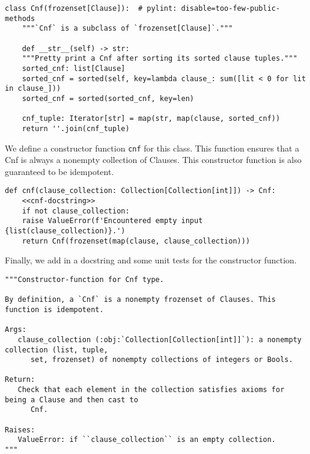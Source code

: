 \documentclass[11pt]{article}
\begin{document}
\begin{verbatim}
class Cnf(frozenset[Clause]):  # pylint: disable=too-few-public-methods
    """`Cnf` is a subclass of `frozenset[Clause]`."""

    def __str__(self) -> str:
	"""Pretty print a Cnf after sorting its sorted clause tuples."""
	sorted_cnf: list[Clause]
	sorted_cnf = sorted(self, key=lambda clause_: sum([lit < 0 for lit in clause_]))
	sorted_cnf = sorted(sorted_cnf, key=len)

	cnf_tuple: Iterator[str] = map(str, map(clause, sorted_cnf))
	return ''.join(cnf_tuple)
\end{verbatim}

We define a constructor function \texttt{cnf} for this class. This function
ensures that a Cnf is always a nonempty collection of Clauses. This
constructor function is also guaranteed to be idempotent.

\begin{verbatim}
def cnf(clause_collection: Collection[Collection[int]]) -> Cnf:
    <<cnf-docstring>>
    if not clause_collection:
	raise ValueError(f'Encountered empty input {list(clause_collection)}.')
    return Cnf(frozenset(map(clause, clause_collection)))
\end{verbatim}

Finally, we add in a docstring and some unit tests for the constructor function.
\begin{verbatim}
"""Constructor-function for Cnf type.

By definition, a `Cnf` is a nonempty frozenset of Clauses. This function is idempotent.

Args:
   clause_collection (:obj:`Collection[Collection[int]]`): a nonempty collection (list, tuple,
      set, frozenset) of nonempty collections of integers or Bools.

Return:
   Check that each element in the collection satisfies axioms for being a Clause and then cast to
      Cnf.

Raises:
   ValueError: if ``clause_collection`` is an empty collection.
"""
\end{verbatim}
\end{document}

